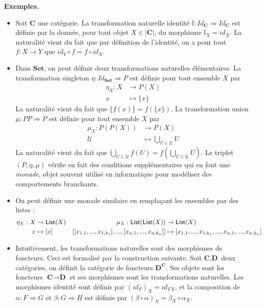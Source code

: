 \documentclass[11pt,a4paper]{article}
\newcommand{\gr}{\textbf}
\newcommand{\il}{\textit}
\newcommand{\U}{\mathcal{U}}
\newcommand{\info}[1]{\text{{\fontfamily{lmss}\selectfont #1}}}
\newcommand{\1}{\mathbbm{1}}
\begin{document}
\gr{Exemples.} \begin{itemize}
\item Soit $\gr{C}$ une catégorie. La transformation naturelle identité $\mathbb{I} : Id_\gr{C} \Rightarrow Id_\gr{C}$ est définie par la donnée, pour tout objet $X \in |\gr{C}|$, du morphisme $\mathbb{I}_X = id_X$. La naturalité vient du fait que par définition de l'identité, on a pour tout $f : X \to Y$ que $id_Y \circ f = f \circ id_X$.
\item Dans $\gr{Set}$, on peut définir deux transformations naturelles élémentaires. La transformation singleton $\eta : Id_\gr{Set} \Rightarrow P$ est définie pour tout ensemble $X$ par
\begin{align*}
\eta_X : X & \to P(X) \\
x & \mapsto \{ x \}
\end{align*}
La naturalité vient du fait que $\{ f(x) \} = f(\{x\})$. La transformation union $\mu : PP \Rightarrow P$ est définie pour tout ensemble $X$ par
\begin{align*}
\mu_X : P(P(X)) & \to P(X) \\
\U & \mapsto \bigcup_{U \in \U} U
\end{align*}
La naturalité vient du fait que $\bigcup_{U\in \U} f(U) = f\left(\bigcup_{U \in \U} U\right)$. Le triplet $(P,\eta,\mu)$ vérifie en fait des conditions supplémentaires qui en font une \il{monade}, objet souvent utilisé en informatique pour modéliser des comportements branchants.
\item On peut définir une monade similaire en remplaçant les ensembles par des listes :
\begin{align*}
 \eta_X : X & \to \info{List}(X) & \mu_X : \info{List}(\info{List}(X)) & \to \info{List}(X)  \\
 x & \mapsto [x] & [[x_{1,1},...,x_{1,k_1}],...,[x_{n,1},...,x_{n,k_n}]] & \mapsto [x_{1,1},...,x_{1,k_1},...,x_{n,1},...,x_{n,k_n}]
\end{align*}
\item Intuitivement, les transformations naturelles sont des morphismes de foncteurs. Ceci est formalisé par la construction suivante. Soit $\gr{C},\gr{D}$ deux catégories, on définit la catégorie de foncteurs $\gr{D}^\gr{C}$. Ses objets sont les foncteurs $\gr{C} \to \gr{D}$ et ses morphismes sont les transformations naturelles. Les morphismes identité sont définis par $(id_F)_X = id_{FX}$, et la composition de $\alpha : F \Rightarrow G$ et $\beta : G \Rightarrow H$ est définie par $(\beta \circ \alpha)_X = \beta_X \circ \alpha_X$.
\end{itemize}
\newpage
\end{document}
